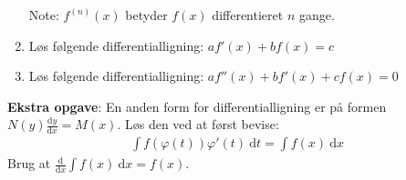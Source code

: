 \documentclass[a4paper]{article}
\theoremstyle{plain}
\theoremstyle{definition}
\newcommand{\dx}{\text{d}}
\begin{document}
\begin{large}
\begin{enumerate}
		Note: $f^{(n)}(x)$ betyder $f(x)$ differentieret $n$ gange.
	\item L{\o}s f{\o}lgende differentialligning: $af'(x)+bf(x)=c$
	\item L{\o}s f{\o}lgende differentialligning: $af''(x)+bf'(x)+cf(x)=0$
\end{enumerate}

\textbf{Ekstra opgave}: En anden form for differentialligning er p{\aa}
formen $N(y) \frac{\dx y}{\dx x} = M(x)$. L{\o}s den ved at f{\o}rst
bevise:
\begin{equation}
\begin{aligned}
	\int f(\varphi(t))\varphi'(t)\ \dx t = \int f(x)\ \dx x
\end{aligned}
\end{equation}
Brug at $\frac{\dx}{\dx x} \int f(x)\ \dx x = f(x)$.
\end{large}
\newpage
\end{document}
